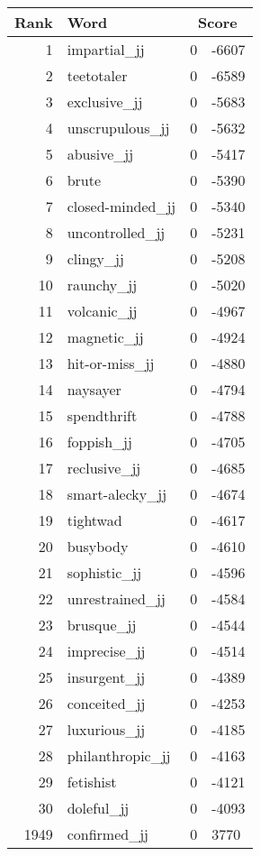 \begin{longtable}[!htbp]{| rlr@{.}l |}
    \hline
    \textbf{Rank} & \textbf{Word} & \multicolumn{2}{c|}{\textbf{Score}} \\
    \hline
    \endhead
    1 & impartial\_jj & 0 & -6607 \\
    2 & teetotaler & 0 & -6589 \\
    3 & exclusive\_jj & 0 & -5683 \\
    4 & unscrupulous\_jj & 0 & -5632 \\
    5 & abusive\_jj & 0 & -5417 \\
    6 & brute & 0 & -5390 \\
    7 & closed-minded\_jj & 0 & -5340 \\
    8 & uncontrolled\_jj & 0 & -5231 \\
    9 & clingy\_jj & 0 & -5208 \\
    10 & raunchy\_jj & 0 & -5020 \\
    11 & volcanic\_jj & 0 & -4967 \\
    12 & magnetic\_jj & 0 & -4924 \\
    13 & hit-or-miss\_jj & 0 & -4880 \\
    14 & naysayer & 0 & -4794 \\
    15 & spendthrift & 0 & -4788 \\
    16 & foppish\_jj & 0 & -4705 \\
    17 & reclusive\_jj & 0 & -4685 \\
    18 & smart-alecky\_jj & 0 & -4674 \\
    19 & tightwad & 0 & -4617 \\
    20 & busybody & 0 & -4610 \\
    21 & sophistic\_jj & 0 & -4596 \\
    22 & unrestrained\_jj & 0 & -4584 \\
    23 & brusque\_jj & 0 & -4544 \\
    24 & imprecise\_jj & 0 & -4514 \\
    25 & insurgent\_jj & 0 & -4389 \\
    26 & conceited\_jj & 0 & -4253 \\
    27 & luxurious\_jj & 0 & -4185 \\
    28 & philanthropic\_jj & 0 & -4163 \\
    29 & fetishist & 0 & -4121 \\
    30 & doleful\_jj & 0 & -4093 \\
    1949 & confirmed\_jj & 0 & 3770 \\

\end{longtable}
